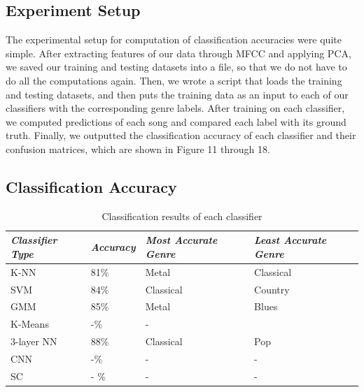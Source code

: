 \subsection{Experiment Setup}
The experimental setup for computation of classification accuracies were quite simple. After extracting features of our data through MFCC and applying PCA, we saved our training and testing datasets into a file, so that we do not have to do all the computations again. Then, we wrote a script that loads the training and testing datasets, and then puts the training data as an input to each of our classifiers with the corresponding genre labels. After training on each classifier, we computed predictions of each song and compared each label with its ground truth. Finally, we outputted the classification accuracy of each classifier and their confusion matrices, which are shown in Figure 11 through 18.

\subsection{Classification Accuracy}

\begin{table}
\begin{center}
\caption{Classification results of each classifier} 
\begin{tabular}{ p{1.9cm} p{1.1cm} p{2.8cm} p{2.8cm}}
 \emph{Classifier Type} & \emph{Accuracy}  & \emph{Most Accurate Genre} & \emph{Least Accurate Genre}\\
 \hline
 K-NN & 81\% & Metal & Classical \\
 SVM & 84\% & Classical & Country \\
 GMM & 85\% & Metal & Blues \\
 K-Means & -\% & - & \\
 3-layer NN & 88\% & Classical & Pop \\
 CNN & -\% & - & - \\
 SC & - \% & -  & -  \\
\end{tabular}
\end{center}
\end{table}

